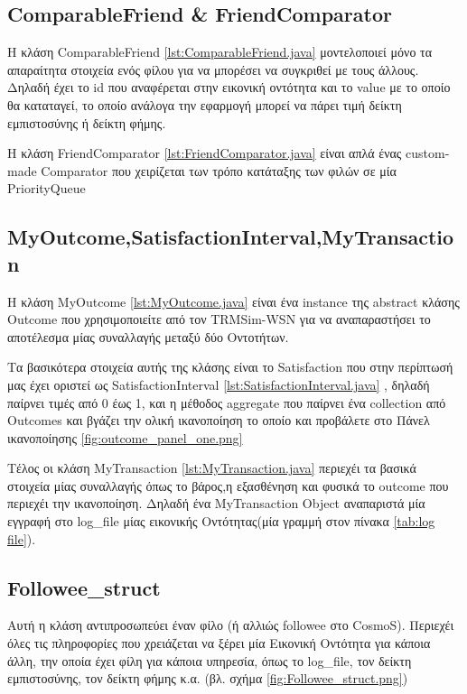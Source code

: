 \subsection{ComparableFriend \& FriendComparator}
 Η κλάση ComparableFriend \ref{lst:ComparableFriend.java} μοντελοποιεί μόνο τα απαραίτητα στοιχεία ενός φίλου για να μπορέσει να συγκριθεί με τους άλλους. Δηλαδή έχει το id που αναφέρεται στην εικονική οντότητα και το value με το οποίο θα καταταγεί, το οποίο ανάλογα την εφαρμογή μπορεί να πάρει τιμή δείκτη εμπιστοσύνης ή δείκτη φήμης.

 
Η κλάση FriendComparator \ref{lst:FriendComparator.java} είναι απλά ένας custom-made Comparator που χειρίζεται των τρόπο κατάταξης των φιλών σε μία PriorityQueue
 
 
\newpage


\subsection{MyOutcome,SatisfactionInterval,MyTransaction}

Η κλάση MyOutcome \ref{lst:MyOutcome.java} είναι ένα instance της abstract κλάσης Outcome που χρησιμοποιείτε από τον TRMSim-WSN για να αναπαραστήσει το αποτέλεσμα μίας συναλλαγής μεταξύ δύο Οντοτήτων.
 
 
  Τα βασικότερα στοιχεία αυτής της κλάσης είναι το Satisfaction που στην περίπτωσή μας έχει οριστεί ως SatisfactionInterval  \ref{lst:SatisfactionInterval.java} , δηλαδή παίρνει τιμές από 0 έως 1, και η μέθοδος aggregate  που παίρνει ένα collection από Outcomes και βγάζει την ολική ικανοποίηση το οποίο και προβάλετε στο Πάνελ ικανοποίησης \ref{fig:outcome_panel_one.png}

Tέλος οι κλάση MyTransaction \ref{lst:MyTransaction.java} περιεχέι τα βασικά στοιχεία μίας συναλλαγής όπως το βάρος,η εξασθένηση και φυσικά το outcome που περιεχέι την ικανοποίηση. Δηλαδή ένα MyTransaction Object αναπαριστά μία εγγραφή στο log\_file μίας εικονικής Οντότητας(μία γραμμή στον πίνακα \ref{tab:log file}).


\subsection{Followee\_struct}
Αυτή η κλάση αντιπροσωπεύει έναν φίλο (ή αλλιώς followee στο CosmoS). Περιεχέι όλες τις πληροφορίες που χρειάζεται να ξέρει μία Εικονική Οντότητα για κάποια άλλη, την οποία έχει φίλη για κάποια υπηρεσία, όπως το log\_file, τον δείκτη εμπιστοσύνης, τον δείκτη φήμης κ.α. (βλ. σχήμα \ref{fig:Followee_struct.png})

